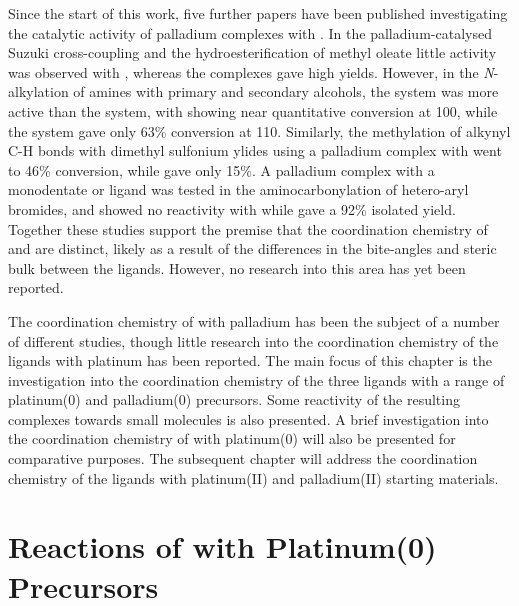 Since the start of this work, five further papers have been published investigating the catalytic activity of palladium complexes with \tBuxantphos{}.\cite{Ashcroft2013, Behr2013, Friis2014, Dang2013, Liu2013c}  In the palladium-catalysed Suzuki cross-coupling and the hydroesterification of methyl oleate little activity was observed with \tBuxantphos{}, whereas the \Phxantphos{} complexes gave high yields.\cite{Ashcroft2013, Behr2013}  However, in the \emph{N}-alkylation of amines with primary and secondary alcohols, the \tBuxantphos{} system was more active than the \Phxantphos{} system, with \tBuxantphos{} showing near quantitative conversion at 100\degC{}, while the \Phxantphos{} system gave only 63\% conversion at 110\degC.  Similarly, the methylation of alkynyl C-H bonds with dimethyl sulfonium ylides using a palladium complex with \tBuxantphos{} went to 46\% conversion, while \Phxantphos{} gave only 15\%.\cite{Liu2013c}  A palladium complex with a monodentate \Phxantphos{} or \tBuxantphos{} ligand was tested in the aminocarbonylation of hetero-aryl bromides, and showed no reactivity with \tBuxantphos{} while \Phxantphos{} gave a 92\% isolated yield.\cite{Friis2014}  Together these studies support the premise that the coordination chemistry of \tBuxantphos{} and \Phxantphos{} are distinct, likely as a result of the differences in the bite-angles and steric bulk between the ligands.  However, no research into this area has yet been reported. 

The coordination chemistry of \Phxantphos{} with palladium has been the subject of a number of different studies, though little research into the coordination chemistry of the \tBuxantphos{} ligands with platinum has been reported.\cite{Zuideveld2002, Raebiger2004, Bakhmutov2012, Miedaner2004, Klingensmith2006, Petocz2004, Yin2002}  The main focus of this chapter is the investigation into the coordination chemistry of the three \tBuxantphos{} ligands with a range of  platinum(0) and palladium(0) precursors.  Some reactivity of the resulting complexes towards small molecules is also presented.  A brief investigation into the coordination chemistry of \Phthixantphos{} with platinum(0) will also be presented for comparative purposes.  The subsequent chapter will address the coordination chemistry of the \tBuxantphos{} ligands with platinum(II) and palladium(II) starting materials.  


\section{Reactions of \Phthixantphos{} with Platinum(0) Precursors}

